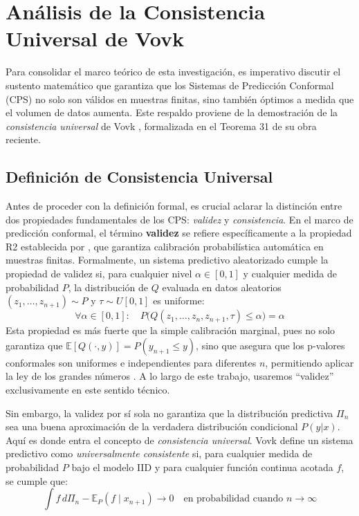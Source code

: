 \section{Análisis de la Consistencia Universal de Vovk}
\label{sec:sustento_teorico_vovk}

Para consolidar el marco teórico de esta investigación, es imperativo discutir el sustento matemático que garantiza que los Sistemas de Predicción Conformal (CPS) no solo son válidos en muestras finitas, sino también óptimos a medida que el volumen de datos aumenta. Este respaldo proviene de la demostración de la \textit{consistencia universal} de Vovk \parencite{Vovk2019}, formalizada en el Teorema 31 de su obra reciente.

\subsection{Definición de Consistencia Universal}


Antes de proceder con la definición formal, es crucial aclarar la distinción entre dos propiedades fundamentales de los CPS: \textit{validez} y \textit{consistencia}. En el marco de predicción conformal, el término \textbf{validez} se refiere específicamente a la propiedad R2 establecida por \cite{Vovk2005}, que garantiza calibración probabilística automática en muestras finitas. Formalmente, un sistema predictivo aleatorizado cumple la propiedad de validez si, para cualquier nivel $\alpha \in [0,1]$ y cualquier medida de probabilidad $P$, la distribución de $Q$ evaluada en datos aleatorios $(z_1, \ldots, z_{n+1}) \sim P$ y $\tau \sim U[0,1]$ es uniforme:
\begin{equation}
    \forall \alpha \in [0,1]: \quad P\big(Q(z_1, \ldots, z_n, z_{n+1}, \tau) \leq \alpha\big) = \alpha
\end{equation}
Esta propiedad es más fuerte que la simple calibración marginal, pues no solo garantiza que $\mathbb{E}[Q(\cdot, y)] = P(y_{n+1} \leq y)$, sino que asegura que los p-valores conformales son uniformes e independientes para diferentes $n$, permitiendo aplicar la ley de los grandes números \parencite{Vovk2019}. A lo largo de este trabajo, usaremos ``validez'' exclusivamente en este sentido técnico.
 
Sin embargo, la validez por sí sola no garantiza que la distribución predictiva $\Pi_n$ sea una buena aproximación de la verdadera distribución condicional $P(y|x)$. Aquí es donde entra el concepto de \textit{consistencia universal}. Vovk define un sistema predictivo como \textit{universalmente consistente} si, para cualquier medida de probabilidad $P$ bajo el modelo IID y para cualquier función continua acotada $f$, se cumple que:
\begin{equation}
    \int f \, d\Pi_n - \mathbb{E}_P(f \mid x_{n+1}) \to 0 \quad \text{en probabilidad cuando } n \to \infty
\end{equation}


